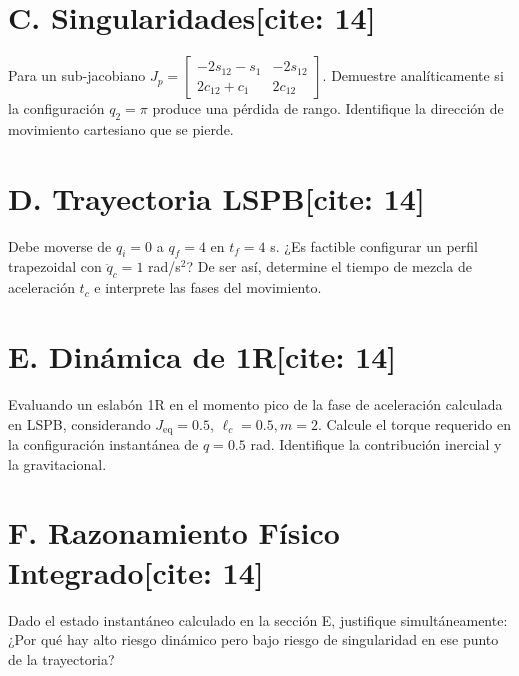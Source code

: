 \documentclass[11pt, a4paper]{article}
\begin{document}
\section*{C. Singularidades[cite: 14]}
Para un sub-jacobiano $J_p = \begin{bmatrix} -2s_{12}-s_1 & -2s_{12} \\ 2c_{12}+c_1 & 2c_{12} \end{bmatrix}$. 
Demuestre analíticamente si la configuración $q_2 = \pi$ produce una pérdida de rango. Identifique la dirección de movimiento cartesiano que se pierde.

\section*{D. Trayectoria LSPB[cite: 14]}
Debe moverse de $q_i=0$ a $q_f=4$ en $t_f=4$ s. ¿Es factible configurar un perfil trapezoidal con $\ddot{q}_c=1$ rad/s$^2$? De ser así, determine el tiempo de mezcla de aceleración $t_c$ e interprete las fases del movimiento.

\section*{E. Dinámica de 1R[cite: 14]}
Evaluando un eslabón 1R en el momento pico de la fase de aceleración calculada en LSPB, considerando $J_{\text{eq}}=0.5$, $\ell_c=0.5, m=2$. Calcule el torque requerido en la configuración instantánea de $q=0.5$ rad. Identifique la contribución inercial y la gravitacional.

\section*{F. Razonamiento Físico Integrado[cite: 14]}
Dado el estado instantáneo calculado en la sección E, justifique simultáneamente: ¿Por qué hay alto riesgo dinámico pero bajo riesgo de singularidad en ese punto de la trayectoria?
\end{document}

